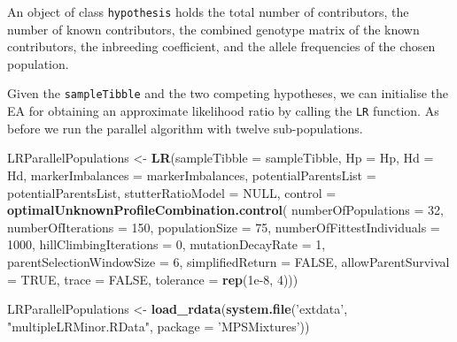 \documentclass[]{article}
\newenvironment{Shaded}{\begin{snugshade}}{\end{snugshade}}
\newcommand{\KeywordTok}[1]{\textcolor[rgb]{0.13,0.29,0.53}{\textbf{#1}}}
\newcommand{\DataTypeTok}[1]{\textcolor[rgb]{0.13,0.29,0.53}{#1}}
\newcommand{\DecValTok}[1]{\textcolor[rgb]{0.00,0.00,0.81}{#1}}
\newcommand{\FloatTok}[1]{\textcolor[rgb]{0.00,0.00,0.81}{#1}}
\newcommand{\StringTok}[1]{\textcolor[rgb]{0.31,0.60,0.02}{#1}}
\newcommand{\OtherTok}[1]{\textcolor[rgb]{0.56,0.35,0.01}{#1}}
\newcommand{\NormalTok}[1]{#1}
\begin{document}
An object of class \texttt{hypothesis} holds the total number of
contributors, the number of known contributors, the combined genotype
matrix of the known contributors, the inbreeding coefficient, and the
allele frequencies of the chosen population.

Given the \texttt{sampleTibble} and the two competing hypotheses, we can
initialise the EA for obtaining an approximate likelihood ratio by
calling the \texttt{LR} function. As before we run the parallel
algorithm with twelve sub-populations.

\begin{Shaded}
\begin{Highlighting}[]
\NormalTok{LRParallelPopulations <-}
\StringTok{    }\KeywordTok{LR}\NormalTok{(}\DataTypeTok{sampleTibble =}\NormalTok{ sampleTibble, }\DataTypeTok{Hp =}\NormalTok{ Hp, }\DataTypeTok{Hd =}\NormalTok{ Hd, }\DataTypeTok{markerImbalances =}\NormalTok{ markerImbalances,}
       \DataTypeTok{potentialParentsList =}\NormalTok{ potentialParentsList, }\DataTypeTok{stutterRatioModel =} \OtherTok{NULL}\NormalTok{,}
       \DataTypeTok{control =} \KeywordTok{optimalUnknownProfileCombination.control}\NormalTok{(}
           \DataTypeTok{numberOfPopulations =} \DecValTok{32}\NormalTok{, }\DataTypeTok{numberOfIterations =} \DecValTok{150}\NormalTok{,}
           \DataTypeTok{populationSize =} \DecValTok{75}\NormalTok{, }\DataTypeTok{numberOfFittestIndividuals =} \DecValTok{1000}\NormalTok{,}
           \DataTypeTok{hillClimbingIterations =} \DecValTok{0}\NormalTok{, }\DataTypeTok{mutationDecayRate =} \DecValTok{1}\NormalTok{,}
           \DataTypeTok{parentSelectionWindowSize =} \DecValTok{6}\NormalTok{, }\DataTypeTok{simplifiedReturn =} \OtherTok{FALSE}\NormalTok{,}
           \DataTypeTok{allowParentSurvival =} \OtherTok{TRUE}\NormalTok{, }\DataTypeTok{trace =} \OtherTok{FALSE}\NormalTok{, }
           \DataTypeTok{tolerance =} \KeywordTok{rep}\NormalTok{(}\FloatTok{1e-8}\NormalTok{, }\DecValTok{4}\NormalTok{)))}
\end{Highlighting}
\end{Shaded}

\begin{Shaded}
\begin{Highlighting}[]
\NormalTok{LRParallelPopulations <-}\StringTok{ }\KeywordTok{load_rdata}\NormalTok{(}\KeywordTok{system.file}\NormalTok{(}\StringTok{'extdata'}\NormalTok{, }\StringTok{"multipleLRMinor.RData"}\NormalTok{, }\DataTypeTok{package =} \StringTok{'MPSMixtures'}\NormalTok{))}
\end{Highlighting}
\end{Shaded}
\end{document}
